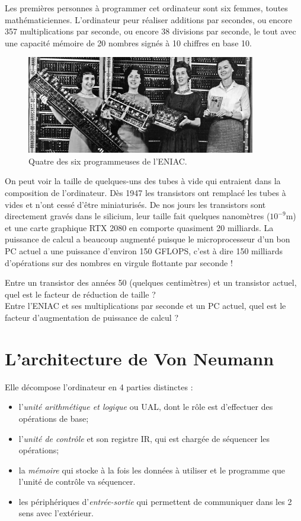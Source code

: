 Les premières personnes à programmer cet ordinateur sont six femmes, toutes mathématiciennes. L'ordinateur peur réaliser  additions par secondes, ou encore 357 multiplications par seconde, ou encore 38 divisions par seconde, le tout avec une capacité mémoire de 20 nombres signés à 10 chiffres en base 10.
\begin{figure}[H]
    \begin{center}
        \includegraphics[width=10cm]{ch-turing/img/eniac.jpg}
    \end{center}
    \caption*{Quatre des six programmeuses de l'ENIAC.}
\end{figure}

On peut voir la taille de quelques-uns des  tubes à vide qui entraient dans la composition de l'ordinateur. Dès 1947 les transistors ont remplacé les tubes à vides et n'ont cessé d'être miniaturisés. De nos jours les transistors sont directement gravés dans le silicium, leur taille fait quelques nanomètres ($10^{-9}$m) et une carte graphique RTX 2080 en comporte quasiment 20 milliards. La puissance de calcul a beaucoup augmenté puisque le microprocesseur d'un bon PC actuel a une puissance d'environ 150 GFLOPS,  c'est à dire 150 milliards d'opérations sur des nombres en virgule flottante par seconde !

\begin{exercice}[]
    Entre un transistor des années 50 (quelques centimètres) et un transistor actuel, quel est le facteur de réduction de taille ?\\
    Entre l'ENIAC et ses multiplications par seconde et un PC actuel, quel est le facteur d'augmentation de puissance de calcul ?
\end{exercice}

\section{L'architecture de Von Neumann}



Elle décompose l'ordinateur en 4 parties distinctes :
\begin{itemize}
    \item 	l'\textit{unité arithmétique et logique} ou UAL, dont le rôle est d'effectuer des opérations de base;
    \item 	l'\textit{unité de contrôle} et son registre IR, qui est chargée de séquencer les opérations;
    \item 	la \textit{mémoire} qui stocke à la fois les données à utiliser et le programme que l'unité de contrôle va séquencer.
    \item 	les périphériques d'\textit{entrée-sortie} qui permettent de communiquer dans les 2 sens avec l'extérieur.
\end{itemize}

